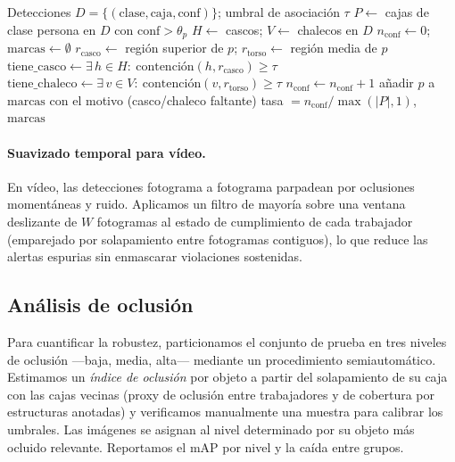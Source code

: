 \documentclass{article}
\begin{document}
\begin{algorithm}[t]
\caption{Verificador de cumplimiento por fotograma}
\label{alg:verifier}
\begin{algorithmic}[1]
\Require Detecciones $D=\{(\text{clase},\text{caja},\text{conf})\}$; umbral de asociación $\tau$
\State $P \gets$ cajas de clase \textsf{persona} en $D$ con $\text{conf}>\theta_p$
\State $H \gets$ cascos; $V \gets$ chalecos en $D$
\State $n_{\text{conf}} \gets 0$;\quad $\text{marcas} \gets \emptyset$
  \State $r_{\text{casco}} \gets$ región superior de $p$;\;\; $r_{\text{torso}} \gets$ región media de $p$
  \State $\text{tiene\_casco} \gets \exists\, h\!\in\!H:\ \mathrm{contención}(h, r_{\text{casco}}) \ge \tau$
  \State $\text{tiene\_chaleco} \gets \exists\, v\!\in\!V:\ \mathrm{contención}(v, r_{\text{torso}}) \ge \tau$
     \State $n_{\text{conf}} \gets n_{\text{conf}} + 1$
  \Else
     \State añadir $p$ a $\text{marcas}$ con el motivo (casco/chaleco faltante)
  \EndIf
\EndFor
\State \Return tasa $= n_{\text{conf}} / \max(|P|,1)$, $\text{marcas}$
\end{algorithmic}
\end{algorithm}

\paragraph{Suavizado temporal para vídeo.} En vídeo, las detecciones fotograma
a fotograma parpadean por oclusiones momentáneas y ruido. Aplicamos un filtro
de mayoría sobre una ventana deslizante de $W$ fotogramas al estado de
cumplimiento de cada trabajador (emparejado por solapamiento entre fotogramas
contiguos), lo que reduce las alertas espurias sin enmascarar violaciones
sostenidas.

\subsection{Análisis de oclusión}
\label{sec:occlusion-method}
Para cuantificar la robustez, particionamos el conjunto de prueba en tres
niveles de oclusión —baja, media, alta— mediante un procedimiento
semiautomático. Estimamos un \emph{índice de oclusión} por objeto a partir del
solapamiento de su caja con las cajas vecinas (proxy de oclusión entre
trabajadores y de cobertura por estructuras anotadas) y verificamos
manualmente una muestra para calibrar los umbrales. Las imágenes se asignan al
nivel determinado por su objeto más ocluido relevante. Reportamos el mAP por
nivel y la caída entre grupos.
\end{document}
